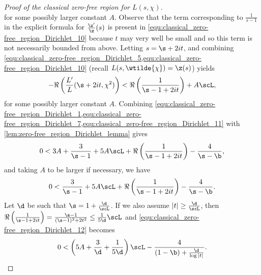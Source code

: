 \begin{proof}[Proof of the classical zero-free region for $L(s,\chi)$]
\begin{equation}
        \end{equation}
        for some possibly larger constant $A$. Observe that the term corresponding to $\frac{1}{s-1}$ in the explicit formula for $\frac{\z'}{\z}(s)$ is present in \cref{equ:classical_zero-free_region_Dirichlet_10} because $t$ may very well be small and so this term is not necessarily bounded from above. Letting $s = \s+2it$, and combining \cref{equ:classical_zero-free_region_Dirichlet_5,equ:classical_zero-free_region_Dirichlet_10} (recall $L(s,\wtilde{\chi}) = \z(s)$) yields
        \begin{equation}\label{equ:classical_zero-free_region_Dirichlet_11}
          -\Re\left(\frac{L'}{L}(\s+2it,\chi^{2})\right) < \Re\left(\frac{1}{\s-1+2it}\right)+A\scL,
        \end{equation}
        for some possibly larger constant $A$. Combining \cref{equ:classical_zero-free_region_Dirichlet_1,equ:classical_zero-free_region_Dirichlet_7,equ:classical_zero-free_region_Dirichlet_11} with \cref{lem:zero-free_region_Dirichlet_lemma} gives
        \[
          0 < 3A+\frac{3}{\s-1}+5A\scL+\Re\left(\frac{1}{\s-1+2it}\right)-\frac{4}{\s-\b},
        \]
        and taking $A$ to be larger if necessary, we have
        \begin{equation}\label{equ:classical_zero-free_region_Dirichlet_12}
          0 < \frac{3}{\s-1}+5A\scL+\Re\left(\frac{1}{\s-1+2it}\right)-\frac{4}{\s-\b}.
        \end{equation}
        Let $\d$ be such that $\s = 1+\frac{\d}{\scL}$. If we also assume $|t| \ge \frac{\d}{\scL}$, then $\Re\left(\frac{1}{\s-1+2it}\right) = \frac{\s-1}{(\s-1)^{2}+2t^{2}} \le \frac{1}{5\d}\scL$ and \cref{equ:classical_zero-free_region_Dirichlet_12} becomes
        \[
          0 < \left(5A+\frac{3}{\d}+\frac{1}{5\d}\right)\scL-\frac{4}{(1-\b)+\frac{\d}{\log|t|}}.
        \]

\end{proof}
